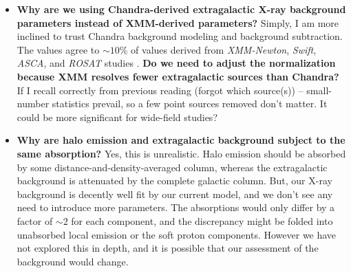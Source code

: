 \documentclass[preprint2,tighten,trackchanges]{aastex6}
\newcommand*{\abt}{\mathord{\sim}} %
\begin{document}
\begin{itemize}
    \item \textbf{Why are we using Chandra-derived extragalactic X-ray background
        parameters instead of XMM-derived parameters?}
        Simply, I am more inclined to trust Chandra background modeling and
        background subtraction.
        The \citet{hickox2006} values agree to $\abt 10\%$ of values derived
        from \textit{XMM-Newton}, \textit{Swift}, \textit{ASCA}, and
        \textit{ROSAT} studies
        \citep{chen1997, kushino2002, de-luca2004, moretti2009}.
        \textbf{Do we need to adjust the normalization because XMM resolves
        fewer extragalactic sources than Chandra?}
        If I recall correctly from previous reading (forgot which source(s)) --
        small-number statistics prevail, so a few point sources removed don't
        matter.  It could be more significant for wide-field studies?
    \item \textbf{Why are halo emission and extragalactic background subject to
        the same absorption?}
        Yes, this is unrealistic.  Halo emission should be absorbed by some
        distance-and-density-averaged column, whereas the extragalactic
        background is attenuated by the complete galactic column.
        But, our X-ray background is decently well fit by our current model,
        and we don't see any need to introduce more parameters.
        The absorptions would only differ by a factor of $\abt 2$ for each
        component, and the discrepancy might be folded into unabsorbed local
        emission or the soft proton components.
        However we have not explored this in depth, and it is possible that our
        assessment of the background would change.
\end{itemize}
\end{document}
